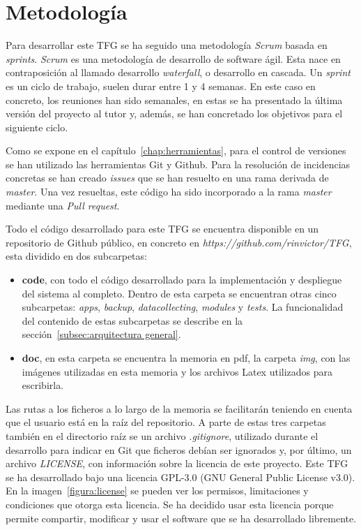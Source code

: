 \documentclass[a4paper, 12pt, oneside]{book}
\begin{document}
\section{Metodología}
\label{sec:Metodología}
Para desarrollar este TFG se ha seguido una metodología \textit{Scrum} basada en \textit{sprints}.
\textit{Scrum} es una metodología de desarrollo de software ágil. Esta nace en contraposición al llamado desarrollo \textit{waterfall}, o desarrollo en cascada. Un \textit{sprint} es un ciclo de trabajo, suelen durar entre 1 y 4 semanas.
En este caso en concreto, los reuniones han sido semanales, en estas se ha presentado la última versión del proyecto al tutor y, además, se han concretado los objetivos para el siguiente ciclo.

Como se expone en el capítulo~\ref{chap:herramientas}, para el control de versiones se han utilizado las herramientas Git y Github. Para la resolución de incidencias concretas se han creado \textit{issues} que se han resuelto en una rama derivada de \textit{master}. Una vez resueltas, este código ha sido incorporado a la rama \textit{master} mediante una \textit{Pull request}.

Todo el código desarrollado para este TFG se encuentra disponible en un repositorio de Github público, en concreto en \textit{https://github.com/rinvictor/TFG}, esta dividido en dos subcarpetas: 
\begin{itemize}
\item \textbf{code}, con todo el código desarrollado para la implementación y despliegue del sistema al completo. Dentro de esta carpeta se encuentran otras cinco subcarpetas: \textit{apps}, \textit{backup}, \textit{datacollecting}, \textit{modules} y \textit{tests}. La funcionalidad del contenido de estas subcarpetas se describe en la sección~\ref{subsec:arquitectura general}.

\item \textbf{doc}, en esta carpeta se encuentra la memoria en pdf, la carpeta \textit{img}, con las imágenes utilizadas en esta memoria y los archivos Latex utilizados para escribirla.
\end{itemize}

Las rutas a los ficheros a lo largo de la memoria se facilitarán teniendo en cuenta que el usuario está en la raíz del repositorio.
A parte de estas tres carpetas también en el directorio raíz se un archivo \textit{.gitignore}, utilizado durante el desarrollo para indicar en Git que ficheros debían ser ignorados y, por último, un archivo \textit{LICENSE}, con información sobre la licencia de este proyecto.
Este TFG se ha desarrollado bajo una licencia GPL-3.0 (GNU General Public License v3.0). En la imagen~\ref{figura:license} se pueden ver los permisos, limitaciones y condiciones que otorga esta licencia. Se ha decidido usar esta licencia porque permite compartir, modificar y usar el software que se ha desarrollado libremente.
\end{document}
